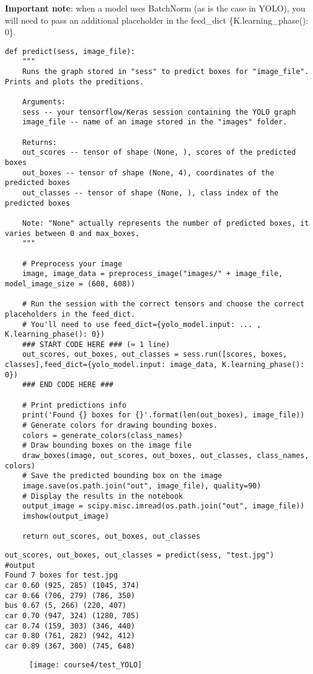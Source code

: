 {\textbf{Important note}}: when a model uses BatchNorm (as is the case in YOLO), you will need to pass an additional placeholder in the feed\_dict \{K.learning\_phase(): 0\}.
\begin{verbatim}
def predict(sess, image_file):
    """
    Runs the graph stored in "sess" to predict boxes for "image_file". Prints and plots the preditions.
    
    Arguments:
    sess -- your tensorflow/Keras session containing the YOLO graph
    image_file -- name of an image stored in the "images" folder.
    
    Returns:
    out_scores -- tensor of shape (None, ), scores of the predicted boxes
    out_boxes -- tensor of shape (None, 4), coordinates of the predicted boxes
    out_classes -- tensor of shape (None, ), class index of the predicted boxes
    
    Note: "None" actually represents the number of predicted boxes, it varies between 0 and max_boxes. 
    """

    # Preprocess your image
    image, image_data = preprocess_image("images/" + image_file, model_image_size = (608, 608))

    # Run the session with the correct tensors and choose the correct placeholders in the feed_dict.
    # You'll need to use feed_dict={yolo_model.input: ... , K.learning_phase(): 0})
    ### START CODE HERE ### (≈ 1 line)
    out_scores, out_boxes, out_classes = sess.run([scores, boxes, classes],feed_dict={yolo_model.input: image_data, K.learning_phase(): 0})
    ### END CODE HERE ###

    # Print predictions info
    print('Found {} boxes for {}'.format(len(out_boxes), image_file))
    # Generate colors for drawing bounding boxes.
    colors = generate_colors(class_names)
    # Draw bounding boxes on the image file
    draw_boxes(image, out_scores, out_boxes, out_classes, class_names, colors)
    # Save the predicted bounding box on the image
    image.save(os.path.join("out", image_file), quality=90)
    # Display the results in the notebook
    output_image = scipy.misc.imread(os.path.join("out", image_file))
    imshow(output_image)
    
    return out_scores, out_boxes, out_classes
\end{verbatim}

\begin{verbatim}
out_scores, out_boxes, out_classes = predict(sess, "test.jpg")
#output
Found 7 boxes for test.jpg
car 0.60 (925, 285) (1045, 374)
car 0.66 (706, 279) (786, 350)
bus 0.67 (5, 266) (220, 407)
car 0.70 (947, 324) (1280, 705)
car 0.74 (159, 303) (346, 440)
car 0.80 (761, 282) (942, 412)
car 0.89 (367, 300) (745, 648)
\end{verbatim}
\clearpage
\begin{figure}[h]
\begin{center}
\texttt{[image: course4/test\_YOLO]}
\end{center}
\end{figure}


